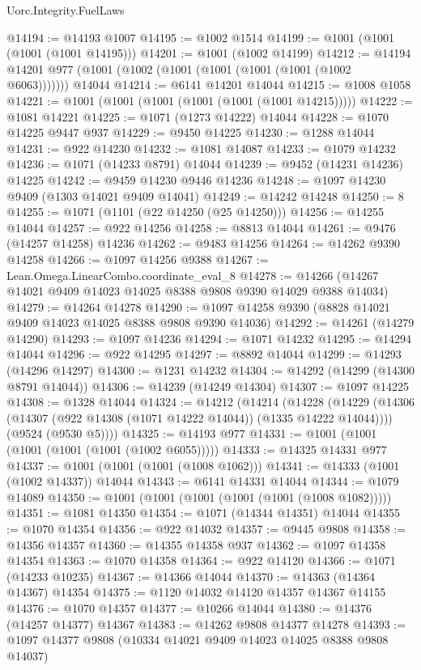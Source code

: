 \begin{lexlean}{Uorc.Integrity.FuelLaws}
\begin{coremodule}
@14194 := @14193 @1007
@14195 := @1002 @1514
@14199 := @1001 (@1001 (@1001 (@1001 @14195)))
@14201 := @1001 (@1002 @14199)
@14212 := @14194 @14201 @977 (@1001 (@1002 (@1001 (@1001 (@1001 (@1001 (@1002 @6063))))))) @14044
@14214 := @6141 @14201 @14044
@14215 := @1008 @1058
@14221 := @1001 (@1001 (@1001 (@1001 (@1001 (@1001 @14215)))))
@14222 := @1081 @14221
@14225 := @1071 (@1273 @14222) @14044
@14228 := @1070 @14225 @9447 @937
@14229 := @9450 @14225
@14230 := @1288 @14044
@14231 := @922 @14230
@14232 := @1081 @14087
@14233 := @1079 @14232
@14236 := @1071 (@14233 @8791) @14044
@14239 := @9452 (@14231 @14236) @14225
@14242 := @9459 @14230 @9446 @14236
@14248 := @1097 @14230 @9409 (@1303 @14021 @9409 @14041)
@14249 := @14242 @14248
@14250 := 8
@14255 := @1071 (@1101 (@22 @14250 (@25 @14250)))
@14256 := @14255 @14044
@14257 := @922 @14256
@14258 := @8813 @14044
@14261 := @9476 (@14257 @14258) @14236
@14262 := @9483 @14256
@14264 := @14262 @9390 @14258
@14266 := @1097 @14256 @9388
@14267 := Lean.Omega.LinearCombo.coordinate_eval_8
@14278 := @14266 (@14267 @14021 @9409 @14023 @14025 @8388 @9808 @9390 @14029 @9388 @14034)
@14279 := @14264 @14278
@14290 := @1097 @14258 @9390 (@8828 @14021 @9409 @14023 @14025 @8388 @9808 @9390 @14036)
@14292 := @14261 (@14279 @14290)
@14293 := @1097 @14236
@14294 := @1071 @14232
@14295 := @14294 @14044
@14296 := @922 @14295
@14297 := @8892 @14044
@14299 := @14293 (@14296 @14297)
@14300 := @1231 @14232
@14304 := @14292 (@14299 (@14300 @8791 @14044))
@14306 := @14239 (@14249 @14304)
@14307 := @1097 @14225
@14308 := @1328 @14044
@14324 := @14212
    (@14214
      (@14228
        (@14229 (@14306 (@14307 (@922 @14308 (@1071 @14222 @14044)) (@1335 @14222 @14044))))
        (@9524 (@9530 @5))))
@14325 := @14193 @977
@14331 := @1001 (@1001 (@1001 (@1001 (@1001 (@1002 @6055)))))
@14333 := @14325 @14331 @977
@14337 := @1001 (@1001 (@1001 (@1008 @1062)))
@14341 := @14333 (@1001 (@1002 @14337)) @14044
@14343 := @6141 @14331 @14044
@14344 := @1079 @14089
@14350 := @1001 (@1001 (@1001 (@1001 (@1001 (@1008 @1082)))))
@14351 := @1081 @14350
@14354 := @1071 (@14344 @14351) @14044
@14355 := @1070 @14354
@14356 := @922 @14032
@14357 := @9445 @9808
@14358 := @14356 @14357
@14360 := @14355 @14358 @937
@14362 := @1097 @14358 @14354
@14363 := @1070 @14358
@14364 := @922 @14120
@14366 := @1071 (@14233 @10235)
@14367 := @14366 @14044
@14370 := @14363 (@14364 @14367) @14354
@14375 := @1120 @14032 @14120 @14357 @14367 @14155
@14376 := @1070 @14357
@14377 := @10266 @14044
@14380 := @14376 (@14257 @14377) @14367
@14383 := @14262 @9808 @14377 @14278
@14393 := @1097 @14377 @9808 (@10334 @14021 @9409 @14023 @14025 @8388 @9808 @14037)

\end{coremodule}
\end{lexlean}
